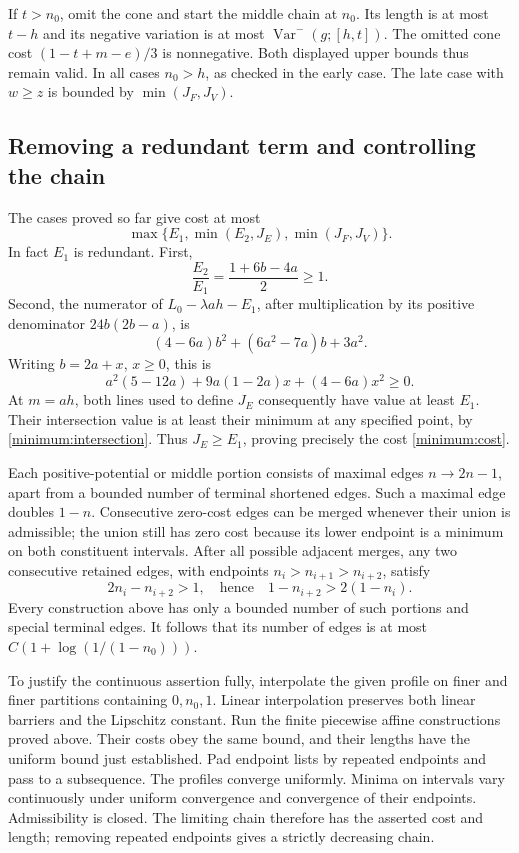 If \(t>n_0\), omit the cone and start the middle chain at \(n_0\).
Its length is at most \(t-h\) and its negative variation is at most
\(\operatorname{Var}^-(g;[h,t])\). The omitted cone cost
\((1-t+m-e)/3\) is nonnegative. Both displayed upper bounds thus
remain valid. In all cases \(n_0>h\), as checked in the early case.
The late case with \(w\ge z\) is bounded by \(\min(J_F,J_V)\).

\subsection{Removing a redundant term and controlling the chain}
The cases proved so far give cost at most
\[
 \max\{E_1,\min(E_2,J_E),\min(J_F,J_V)\}.
\]
In fact \(E_1\) is redundant. First,
\[
 \frac{E_2}{E_1}=\frac{1+6b-4a}{2}\ge1.
\]
Second, the numerator of \(L_0-\lambda ah-E_1\), after multiplication
by its positive denominator \(24b(2b-a)\), is
\[
 (4-6a)b^2+(6a^2-7a)b+3a^2.
\]
Writing \(b=2a+x\), \(x\ge0\), this is
\[
 a^2(5-12a)+9a(1-2a)x+(4-6a)x^2\ge0.
\]
At \(m=ah\), both lines used to define \(J_E\) consequently have
value at least \(E_1\). Their intersection value is at least their
minimum at any specified point, by \eqref{minimum:intersection}.
Thus \(J_E\ge E_1\), proving precisely the cost
\eqref{minimum:cost}.

Each positive-potential or middle portion consists of maximal edges
\(n\to2n-1\), apart from a bounded number of terminal shortened edges.
Such a maximal edge doubles \(1-n\). Consecutive zero-cost edges
can be merged whenever their union is admissible; the union still has
zero cost because its lower endpoint is a minimum on both constituent
intervals. After all possible adjacent merges, any two consecutive retained
edges, with endpoints \(n_i>n_{i+1}>n_{i+2}\), satisfy
\[
 2n_i-n_{i+2}>1,\quad\text{hence}\quad
 1-n_{i+2}>2(1-n_i).
\]
Every construction above has only a bounded number of such portions and
special terminal edges. It follows that its number of edges is at most
\(C(1+\log(1/(1-n_0)))\).

To justify the continuous assertion fully, interpolate the given profile
on finer and finer partitions containing \(0,n_0,1\). Linear
interpolation preserves both linear barriers and the Lipschitz constant.
Run the finite piecewise affine constructions proved above. Their costs
obey the same bound, and their lengths have the uniform bound just
established. Pad endpoint lists by repeated endpoints and pass to a
subsequence. The profiles converge uniformly. Minima on intervals vary
continuously under uniform convergence and convergence of their endpoints.
Admissibility is closed. The limiting chain therefore has the asserted
cost and length; removing repeated endpoints gives a strictly decreasing
chain.


